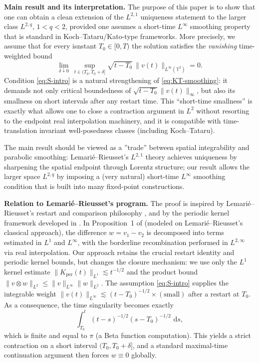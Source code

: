 \documentclass[12pt]{article}
\newcommand{\T}{\mathbb{T}}
\newcommand{\dd}{\,\mathrm{d}}
\theoremstyle{remark}
\theoremstyle{remark}
\begin{document}
\medskip

\noindent\textbf{Main result and its interpretation.}
The purpose of this paper is to show that one can obtain a clean extension of the
$L^{2,1}$ uniqueness statement to the larger class $L^{2,q}$, $1<q<2$, provided one assumes
a short-time $L^\infty$ smoothing property that is standard in Koch--Tataru/Kato-type frameworks.
More precisely, we assume that for every isnstant $T_0\in[0,T)$ the solution satisfies the
\emph{vanishing} time-weighted bound
\begin{equation}\label{eq:S-intro}
\lim_{\delta\downarrow 0}\ \sup_{t\in (T_0,T_0+\delta]}
\sqrt{t-T_0}\,\|v(t)\|_{L^\infty(\T^2)} = 0.
\end{equation}
Condition \eqref{eq:S-intro} is a natural strengthening of \eqref{eq:KT-smoothing}: it demands not only
critical boundedness of $\sqrt{t-T_0}\|v(t)\|_\infty$, but also its smallness on short intervals after any
restart time. This ``short-time smallness'' is exactly what allows one to close a contraction
argument in $L^2$ without resorting to the endpoint real interpolation machinery, and it is
compatible with time-translation invariant well-posedness classes (including Koch--Tataru).

The main result should be viewed as a ''trade'' between spatial integrability and parabolic smoothing:
Lemari\'e--Rieusset's $L^{2,1}$ theory achieves uniqueness by sharpening the spatial endpoint through
Lorentz structure; our result allows the larger space $L^{2,q}$ by imposing a (very natural) short-time
$L^\infty$ smoothing condition that is built into many fixed-point constructions.

\medskip

\noindent\textbf{Relation to Lemari\'e--Rieusset's program.}
The proof is inspired by Lemari\'e--Rieusset's restart and comparison philosophy
\cite{LemarieBook2002,LemarieChemin2007,LemarieMorrey2007}, and by the periodic kernel framework
developed in \cite{LemarieRieusset2025HighlySingular}. In Proposition~1 of \cite{LemarieRieusset2025HighlySingular} (modeled on Lemari\'e--Rieusset's
classical approach), the difference $w=v_1-v_2$ is decomposed into terms estimated in $L^1$ and $L^\infty$,
with the borderline recombination performed in $L^{2,\infty}$ via real interpolation. Our approach retains
the crucial restart identity and periodic kernel bounds, but changes the closure mechanism:
we use only the $L^1$ kernel estimate
$\|K_{\mathrm{per}}(t)\|_{L^1}\lesssim t^{-1/2}$ and the product bound
$\|v\otimes w\|_{L^2}\le \|v\|_{L^\infty}\|w\|_{L^2}$.
The assumption \eqref{eq:S-intro} supplies the integrable weight
$\|v(t)\|_{L^\infty}\lesssim (t-T_0)^{-1/2}\times(\text{small})$ after a restart at $T_0$.
As a consequence, the time singularity becomes exactly
\[
\int_{T_0}^{t} (t-s)^{-1/2}(s-T_0)^{-1/2}\,\dd s,
\]
which is finite and equal to $\pi$ (a Beta function computation). This yields a strict contraction on
a short interval $(T_0,T_0+\delta]$, and a standard maximal-time continuation argument then forces
$w\equiv 0$ globally.
\end{document}
